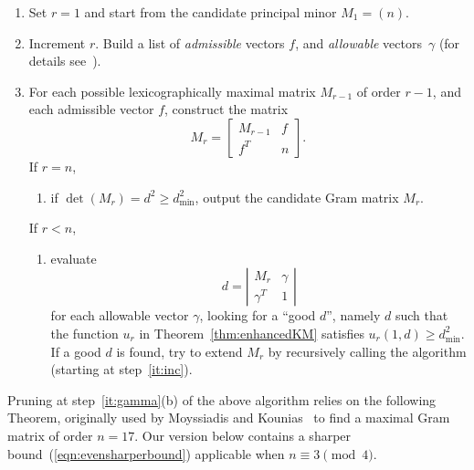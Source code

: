 \documentclass[11pt,a4paper]{article}
\begin{document}
\begin{enumerate}

\item Set $r = 1$ and start from the candidate principal minor $M_1 = (n)$.
\item \label{it:inc}  Increment $r$. 
Build a list of \emph{admissible} vectors $f$, 
and \emph{allowable} vectors~$\gamma$ (for details see~\cite{Orrick05}). 
\item \label{it:f}For each possible 
lexicographically maximal matrix $M_{r-1}$ of order 
$r - 1$, and each admissible vector $f$, construct the matrix
\begin{equation}
M_r = 
\left [
\begin{matrix}
M_{r-1} & f\\
f^T & n
\end{matrix}
\right ].
\end{equation}
If $r = n$, 
\begin{enumerate}
\item[(a)] if $\det(M_r) = d^2 \ge d_{\min}^2$,
output the candidate Gram matrix $M_r$.
\end{enumerate}
If $r < n$, 
\begin{enumerate}
\item[(b)]	\label{it:gamma}
evaluate
\begin{equation}
d =
\left |			%
\begin{matrix}
M_r & \gamma\\
\gamma^T & 1
\end{matrix}
\right |
\end{equation}
for each allowable vector $\gamma$, looking for a ``good $d$'', namely $d$
such that the function $u_r$ 
in Theorem~\ref{thm:enhancedKM} satisfies $u_r(1,d) \ge d_{\min}^2$.
If a good $d$ is found, try to extend $M_r$ by recursively calling
the algorithm (starting at step~\ref{it:inc}).
\end{enumerate}
\end{enumerate}

Pruning at step~\ref{it:gamma}(b) of the above algorithm relies on
the following Theorem, originally used by 
Moyssiadis and Kounias~\cite{MoKo82} 
to find a maximal Gram matrix of order $n=17$.  Our version
below contains a sharper bound~(\ref{eqn:evensharperbound})
applicable when $n \equiv 3 \pmod 4$.

\newpage
\end{document}
